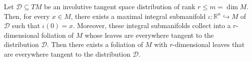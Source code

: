 \begin{definition}[foliation] \label{def:foliation}
\notready
\end{definition}

\begin{theorem} \label{thm:frob-vec}
Let $\mathcal{D} \subseteq TM$ be an involutive tangent space distribution of
rank $r\le m = \dim M$. Then, for every $x\in M$, there exists a maximal
integral submanifold $\iota\colon \mathbb{R}^n \hookrightarrow M$ of
$\mathcal{D}$ such that $\iota(0) = x$. Moreover, these integral submanifolds
collect into a $r$-dimensional foliation of $M$ whose leaves are everywhere
tangent to the distribution $\mathcal{D}$.  Then there exists a foliation of $M$
with $r$-dimensional leaves that are everywhere tangent to the distribution
$\mathcal{D}$.
\end{theorem}
